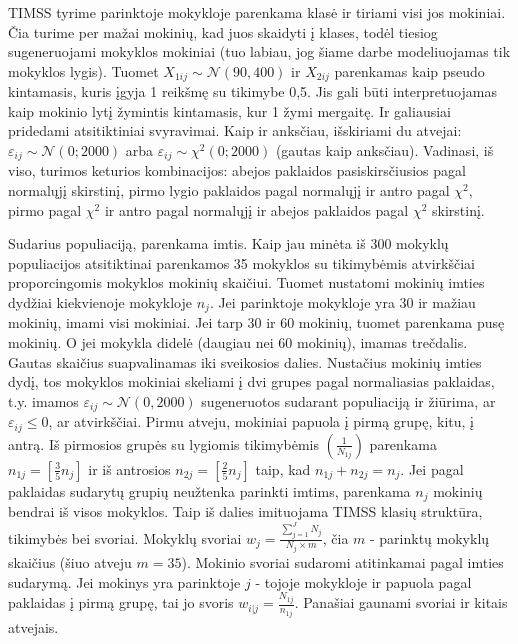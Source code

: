 \documentclass[12pt,a4paper]{article}
\begin{document}
\indent TIMSS tyrime parinktoje mokykloje parenkama klasė ir tiriami visi jos mokiniai. Čia turime per mažai mokinių, kad juos skaidyti į klases, todėl tiesiog sugeneruojami mokyklos mokiniai (tuo labiau, jog šiame darbe modeliuojamas tik mokyklos lygis). Tuomet $X_{1ij}\sim \mathcal{N}(90, 400)$ ir $X_{2ij}$ parenkamas kaip pseudo kintamasis, kuris įgyja 1 reikšmę su tikimybe 0,5. Jis gali būti interpretuojamas kaip mokinio lytį žymintis kintamasis, kur 1 žymi mergaitę. Ir galiausiai pridedami atsitiktiniai svyravimai. Kaip ir anksčiau, išskiriami du atvejai: $\varepsilon_{ij}\sim \mathcal{N}(0; 2000)$ arba $\varepsilon_{ij}\sim \chi^2(0; 2000)$ (gautas kaip anksčiau). Vadinasi, iš viso, turimos keturios kombinacijos: abejos paklaidos pasiskirsčiusios pagal normalųjį skirstinį, pirmo lygio paklaidos pagal normalųjį ir antro pagal $\chi^2$, pirmo pagal $\chi^2$ ir antro pagal normalųjį ir abejos paklaidos pagal $\chi^2$ skirstinį.

\indent Sudarius populiaciją, parenkama imtis. Kaip jau minėta iš 300 mokyklų populiacijos atsitiktinai parenkamos 35 mokyklos su tikimybėmis atvirkščiai proporcingomis mokyklos mokinių skaičiui. Tuomet nustatomi mokinių imties dydžiai kiekvienoje mokykloje $n_j$. Jei parinktoje mokykloje yra 30 ir mažiau mokinių, imami visi mokiniai. Jei tarp 30 ir 60 mokinių, tuomet parenkama pusę mokinių. O jei mokykla didelė (daugiau nei 60 mokinių), imamas trečdalis. Gautas skaičius suapvalinamas iki sveikosios dalies. Nustačius mokinių imties dydį, tos mokyklos mokiniai skeliami į dvi grupes pagal normaliasias paklaidas, t.y. imamos $\varepsilon_{ij}\sim\mathcal{N}(0,2000)$ sugeneruotos sudarant populiaciją ir žiūrima, ar $\varepsilon_{ij} \le 0$, ar atvirkščiai. Pirmu atveju, mokiniai papuola į pirmą grupę, kitu, į antrą. Iš pirmosios grupės su lygiomis tikimybėmis $\left(\frac{1}{N_{1j}}\right)$ parenkama $n_{1j}=\left[\frac{3}{5}n_j\right]$ ir iš antrosios $n_{2j}=\left[\frac{2}{5}n_j\right]$ taip, kad $n_{1j}+n_{2j}=n_j$. Jei pagal paklaidas sudarytų grupių neužtenka parinkti imtims, parenkama $n_j$ mokinių bendrai iš visos mokyklos. Taip iš dalies imituojama TIMSS klasių struktūra, tikimybės bei svoriai. Mokyklų svoriai $w_j=\frac{\sum^J_{j=1}N_j}{N_j\times m}$, čia $m$ - parinktų mokyklų skaičius (šiuo atveju $m=35$). Mokinio svoriai sudaromi atitinkamai pagal imties sudarymą. Jei mokinys yra parinktoje $j$ - tojoje mokykloje ir papuola pagal paklaidas į pirmą grupę, tai jo svoris $w_{i|j}=\frac{N_{1j}}{n_{1j}}$. Panašiai gaunami svoriai ir kitais atvejais.
\end{document}
